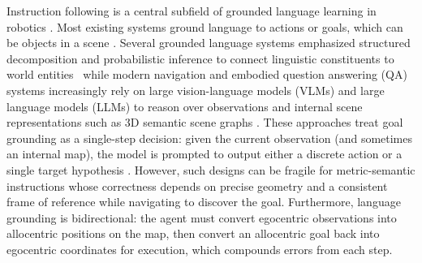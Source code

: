 Instruction following is a central subfield of grounded language learning in robotics \cite{tellexlanguagesurvey}. Most existing systems ground language to actions or goals, which can be objects in a scene \cite{dai2024thinkactaskopenworld}. %
Several grounded language systems emphasized structured decomposition and probabilistic inference to connect linguistic constituents to world entities~\cite{tellex2011symbolgrounding}  while modern navigation and embodied question answering (QA) systems increasingly rely on large vision-language models (VLMs) and large language models (LLMs) to reason over observations and internal scene representations such as $3$D semantic scene graphs \cite{graphEQA, rana2023sayplan}. %
These approaches treat goal grounding as a single-step decision: given the current observation (and sometimes an internal map), the model is prompted to output either a discrete action or a single target hypothesis \cite{vsiBench,frameOfReferenceAmbiguity}.  However, such designs can be fragile for metric-semantic instructions whose correctness depends on precise geometry and a consistent frame of reference while navigating to discover the goal.
Furthermore, language grounding is bidirectional: the agent must convert egocentric observations into allocentric positions on the map, then convert an allocentric goal back into egocentric coordinates for execution, which compounds errors from each step.

